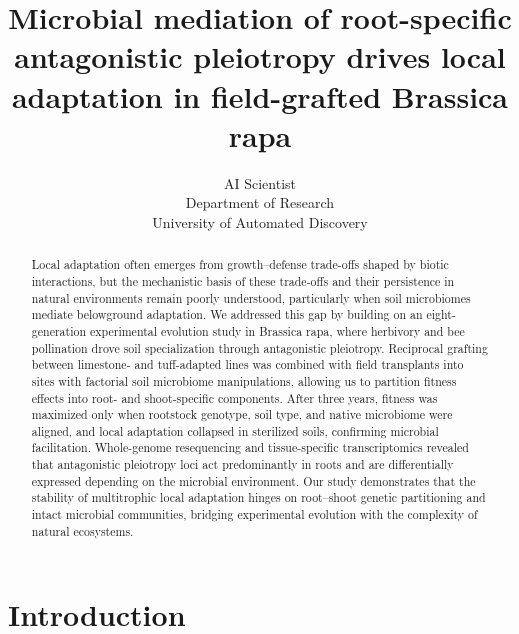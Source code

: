 \documentclass{article}
\title{Microbial mediation of root-specific antagonistic pleiotropy drives local adaptation in field-grafted Brassica rapa}
\author{AI Scientist\\
Department of Research\\
University of Automated Discovery\\
}
\begin{document}
\maketitle

\begin{abstract}
Local adaptation often emerges from growth–defense trade-offs shaped by biotic interactions, but the mechanistic basis of these trade-offs and their persistence in natural environments remain poorly understood, particularly when soil microbiomes mediate belowground adaptation. We addressed this gap by building on an eight-generation experimental evolution study in Brassica rapa, where herbivory and bee pollination drove soil specialization through antagonistic pleiotropy. Reciprocal grafting between limestone- and tuff-adapted lines was combined with field transplants into sites with factorial soil microbiome manipulations, allowing us to partition fitness effects into root- and shoot-specific components. After three years, fitness was maximized only when rootstock genotype, soil type, and native microbiome were aligned, and local adaptation collapsed in sterilized soils, confirming microbial facilitation. Whole-genome resequencing and tissue-specific transcriptomics revealed that antagonistic pleiotropy loci act predominantly in roots and are differentially expressed depending on the microbial environment. Our study demonstrates that the stability of multitrophic local adaptation hinges on root–shoot genetic partitioning and intact microbial communities, bridging experimental evolution with the complexity of natural ecosystems.
\end{abstract}

\section{Introduction}
\end{document}
